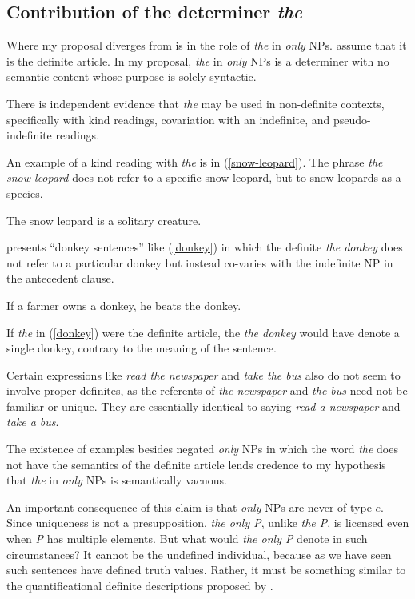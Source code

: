 \subsection{Contribution of the determiner \textit{the}}
Where my proposal diverges from  is in the role of \textit{the} in \textit{only} NPs. \citeauthor{cb2015} assume that it is the definite article. In my proposal, \textit{the} in \textit{only} NPs is a determiner with no semantic content whose purpose is solely syntactic.

There is independent evidence that \textit{the} may be used in non-definite contexts, specifically with kind readings, covariation with an indefinite, and pseudo-indefinite readings.

An example of a kind reading with \textit{the} is in (\ref{snow-leopard}). The phrase \textit{the snow leopard} does not refer to a specific snow leopard, but to snow leopards as a species.

\begin{exe}
	\ex \label{snow-leopard} The snow leopard is a solitary creature.
\end{exe}

\citet{schwarz09} presents ``donkey sentences'' like (\ref{donkey}) in which the definite \textit{the donkey} does not refer to a particular donkey but instead co-varies with the indefinite NP in the antecedent clause.

\begin{exe}
	\ex \label{donkey} If a farmer owns a donkey, he beats the donkey.
\end{exe}

If \textit{the} in (\ref{donkey}) were the definite article, the \textit{the donkey} would have denote a single donkey, contrary to the meaning of the sentence.

Certain expressions like \textit{read the newspaper} and \textit{take the bus} also do not seem to involve proper definites, as the referents of \textit{the newspaper} and \textit{the bus} need not be familiar or unique. They are essentially identical to saying \textit{read a newspaper} and \textit{take a bus}.

The existence of examples besides negated \textit{only} NPs in which the word \textit{the} does not have the semantics of the definite article lends credence to my hypothesis that \textit{the} in \textit{only} NPs is semantically vacuous.

An important consequence of this claim is that \textit{only} NPs are never of type $e$. Since uniqueness is not a presupposition, \textit{the only P}, unlike \textit{the P}, is licensed even when \textit{P} has multiple elements. But what would \textit{the only P} denote in such circumstances? It cannot be the undefined individual, because as we have seen such sentences have defined truth values. Rather, it must be something similar to the quantificational definite descriptions proposed by \citet{russell}.

